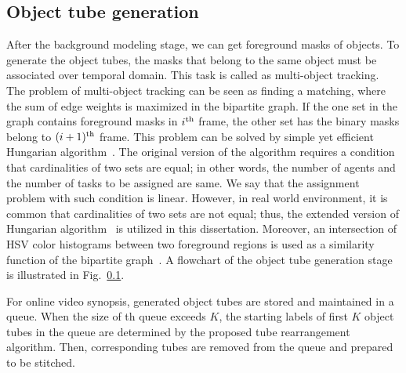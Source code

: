 \documentclass[11pt]{hyu_thesis}
\begin{document}
\subsection{Object tube generation}
After the background modeling stage, we can get foreground masks of objects. To generate the object tubes, the masks that belong to the same object must be associated over temporal domain. This task is called as multi-object tracking. The problem of multi-object tracking can be seen as finding a matching, where the sum of edge weights is maximized in the bipartite graph. If the one set in the graph contains foreground masks in $i^{\rm{th}}$ frame, the other set has the binary masks belong to $(i+1)^{\rm{th}}$ frame. This problem can be solved by simple yet efficient Hungarian algorithm~\cite{Kuhn1955,kuhn1956variants,munkres1957algorithms}. The original version of the algorithm requires a condition that cardinalities of two sets are equal; in other words, the number of agents and the number of tasks to be assigned are same. We say that the assignment problem with such condition is linear. However, in real world environment, it is common that cardinalities of two sets are not equal; thus, the extended version of Hungarian algorithm~\cite{bourgeois1971extension} is utilized in this dissertation. Moreover, an intersection of HSV color histograms between two foreground regions is used as a similarity function of the bipartite graph~\cite{perez2002color}. A flowchart of the object tube generation stage is illustrated in Fig.~\ref{}.

For online video synopsis, generated object tubes are stored and maintained in a queue. When the size of th queue exceeds $K$, the starting labels of first $K$ object tubes in the queue are determined by the proposed tube rearrangement algorithm. Then, corresponding tubes are removed from the queue and prepared to be stitched.
\end{document}
